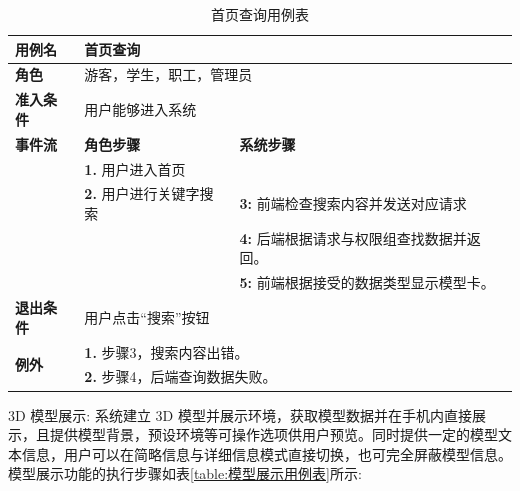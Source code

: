 \begin{table}[H]
  \centering
  \renewcommand\arraystretch{1.1}
  \small
  \caption{首页查询用例表}
  \label{table:首页查询用例表}
  \setlength{\tabcolsep}{4mm}
  \begin{tabular}{|p{2cm}|p{5.75cm}|p{5.75cm}|}
    \hline \textbf{用例名} & \multicolumn{2}{l|}{首页查询} \\
    \hline \textbf{角色} & \multicolumn{2}{l|}{游客，学生，职工，管理员} \\
    \hline \textbf{准入条件} & \multicolumn{2}{l|}{用户能够进入系统} \\
    \hline \textbf{事件流} & \textbf{角色步骤} & \textbf{系统步骤} \\
    \hline \multirow{3}{*}{~} & \textbf{1.} 用户进入首页  &    \\
    \cline{2-3} & \textbf{2.} 用户进行关键字搜索 & \textbf{3:} 前端检查搜索内容并发送对应请求 \\
    \cline{2-3} &  & \textbf{4:} 后端根据请求与权限组查找数据并返回。 \\
    \cline{2-3} &  & \textbf{5:} 前端根据接受的数据类型显示模型卡。 \\
    \hline \textbf{退出条件}  & \multicolumn{2}{l|}{用户点击``搜索''按钮} \\
    \hline \multirow{2}{*}{\textbf{例外}} & \multicolumn{2}{l|}{\textbf{1.} 步骤3，搜索内容出错。} \\
     & \multicolumn{2}{l|}{\textbf{2.} 步骤4，后端查询数据失败。} \\
    \hline
  \end{tabular}
\end{table}

3D 模型展示: 系统建立 3D 模型并展示环境，获取模型数据并在手机内直接展示，且提供模型背景，预设环境等可操作选项供用户预览。同时提供一定的模型文本信息，用户可以在简略信息与详细信息模式直接切换，也可完全屏蔽模型信息。模型展示功能的执行步骤如表\ref{table:模型展示用例表}所示:

